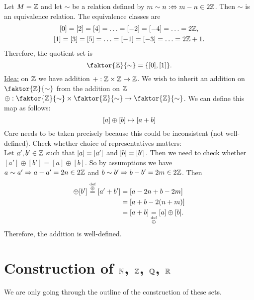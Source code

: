 \begin{example}
	Let \(M = \mathbb Z\) and let \(\sim\) be a relation defined by \(m \sim n :\Leftrightarrow m - n \in 2\mathbb Z\). Then \(\sim\) is an equivalence relation. The equivalence classes are
	\begin{gather*}
		\qty[0] = \qty[2] = \qty[4] = \ldots = \qty[-2] = \qty[-4] = \ldots = 2\mathbb Z, \\
		\qty[1] = \qty[3] = \qty[5] = \ldots = \qty[-1] = \qty[-3] = \ldots = 2\mathbb Z + 1.
	\end{gather*}
	Therefore, the quotient set is
	\begin{equation*}
		\faktor{\Z}{\sim} = \qty{\qty[0], \qty[1]}.
	\end{equation*}
	\uline{Idea:} on \(\mathbb Z\) we have addition \(+: \mathbb Z \times \mathbb Z \to \mathbb Z\). We wish to inherit an addition on \(\faktor{\Z}{\sim}\) from the addition on \(\mathbb Z\) \ie\ \(\oplus: \faktor{\Z}{\sim} \times \faktor{\Z}{\sim} \to \faktor{\Z}{\sim}\). We can define this map as follows:
	\begin{equation*}
		\qty[a] \oplus \qty[b] \mapsto \qty[a + b]
	\end{equation*}
	Care needs to be taken precisely because this could be inconsistent (not well-defined). Check whether choice of representatives matters:\\
	Let \(a', b' \in \mathbb Z\) such that \(\qty[a] = \qty[a']\) and \(\qty[b] = \qty[b']\). Then we need to check whether \([a'] \oplus [b'] = [a] \oplus [b]\). So by assumptions we have \(a \sim a' \Rightarrow a - a' = 2 n \in 2\mathbb Z\) and \(b \sim b' \Rightarrow b - b' = 2 m \in 2\mathbb Z\). Then
	\begin{align*}
		[a'] \oplus [b'] \overset{\stackrel{\text{def}}{\oplus}}{=} \qty[a' + b'] & = [a - 2 n + b - 2 m]                                                         \\
		                                                                          & = [a + b - 2 (n + m)]                                                         \\
		                                                                          & = [a + b] \underset{\stackrel{\text{def}}{\oplus}}{=} \qty[a] \oplus \qty[b].
	\end{align*}
	Therefore, the addition is well-defined.
\end{example}

\section[Construction of Naturals, Integers, Rationals and Reals]{Construction of \(\mathbb N\), \(\mathbb Z\), \(\mathbb Q\), \(\mathbb R\)}
We are only going through the outline of the construction of these sets.

